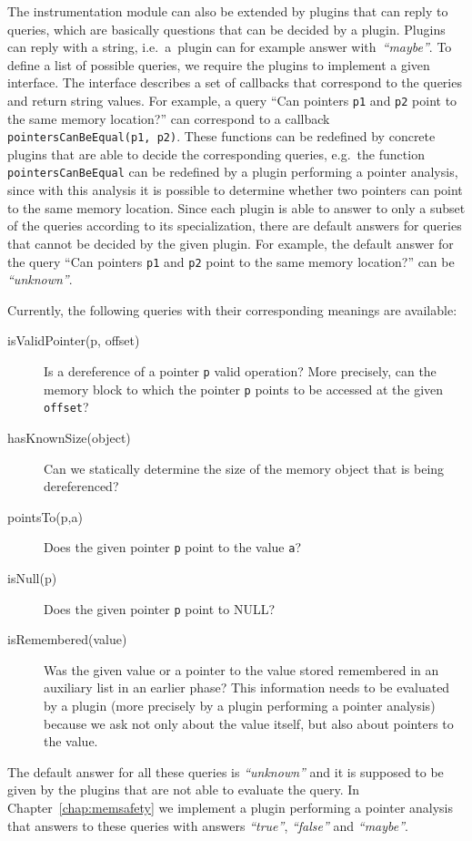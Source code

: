 The instrumentation module can also be extended by plugins that can reply to
queries, which are basically questions that can be decided by a plugin. Plugins
can reply with a string, i.e.~a~plugin can for example answer
with~\emph{``maybe''}.  To define a list of possible queries, we require the
plugins to implement a given interface. The interface describes a set of
callbacks that correspond to the queries and return string values. For example,
a query ``Can pointers \texttt{p1} and \texttt{p2} point to the same memory
location?'' can correspond to a callback \texttt{pointersCanBeEqual(p1, p2)}.
These functions can be redefined by concrete plugins that are able to decide
the corresponding queries, e.g.~the function \texttt{pointersCanBeEqual} can be
redefined by a plugin performing a pointer analysis, since with this analysis
it is possible to determine whether two pointers can point to the same memory
location. Since each plugin is able to answer to only a subset of the queries
according to its specialization, there are default answers for queries that
cannot be decided by the given plugin. For example, the default answer for the
query ``Can pointers \texttt{p1} and \texttt{p2} point to the same memory
location?'' can be \emph{``unknown''}.

Currently, the following queries with their corresponding meanings are available:
\begin{description}
  \item[isValidPointer(p, offset)] Is a dereference of a pointer \texttt{p}
  valid operation? More precisely, can the memory block to which the pointer
  \texttt{p} points to be accessed at the given \texttt{offset}?
  \item[hasKnownSize(object)] Can we statically determine the size of the memory
         object that is being dereferenced?
  \item[pointsTo(p,a)] Does the given pointer \texttt{p} point to the value \texttt{a}?
  \item[isNull(p)] Does the given pointer \texttt{p} point to NULL?
  \item[isRemembered(value)] Was the given value or a pointer to the value
  stored remembered in an auxiliary list in an earlier phase? This information
  needs to be evaluated by a plugin (more precisely by a plugin performing a
  pointer analysis) because we ask not only about the value itself, but also
  about pointers to the value.
\end{description}
The default answer for all these queries is \emph{``unknown''} and it is
supposed to be given by the plugins that are not able to evaluate the query. In
Chapter~\ref{chap:memsafety} we implement a plugin performing a pointer
analysis that answers to these queries with answers \emph{``true''},
\emph{``false''} and \emph{``maybe''}.

